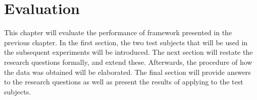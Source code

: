 
\chapter{Evaluation}
\label{ch:evaluation}
This chapter will evaluate the performance of framework presented in the previous chapter. In the first section, the two test subjects that will be used in the subsequent experiments will be introduced. The next section will restate the research questions formally, and extend these. Afterwards, the procedure of how the data was obtained will be elaborated. The final section will provide answers to the research questions as well as present the results of applying \tcp{} to the test subjects.




\clearpage

